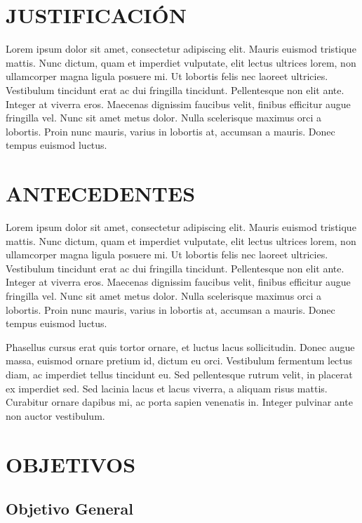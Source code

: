 \documentclass[stu, 12pt, helv, letterpaper, donotrepeattitle, floatsintext, natbib]{apa7}
\begin{document}
\section*{JUSTIFICACIÓN}

Lorem ipsum dolor sit amet, consectetur adipiscing elit. Mauris euismod tristique mattis. Nunc dictum, quam et imperdiet vulputate, elit lectus ultrices lorem, non ullamcorper magna ligula posuere mi. Ut lobortis felis nec laoreet ultricies. Vestibulum tincidunt erat ac dui fringilla tincidunt. Pellentesque non elit ante. Integer at viverra eros. Maecenas dignissim faucibus velit, finibus efficitur augue fringilla vel. Nunc sit amet metus dolor. Nulla scelerisque maximus orci a lobortis. Proin nunc mauris, varius in lobortis at, accumsan a mauris. Donec tempus euismod luctus.

\section*{ANTECEDENTES}

Lorem ipsum dolor sit amet, consectetur adipiscing elit. Mauris euismod tristique mattis. Nunc dictum, quam et imperdiet vulputate, elit lectus ultrices lorem, non ullamcorper magna ligula posuere mi. Ut lobortis felis nec laoreet ultricies. Vestibulum tincidunt erat ac dui fringilla tincidunt. Pellentesque non elit ante. Integer at viverra eros. Maecenas dignissim faucibus velit, finibus efficitur augue fringilla vel. Nunc sit amet metus dolor. Nulla scelerisque maximus orci a lobortis. Proin nunc mauris, varius in lobortis at, accumsan a mauris. Donec tempus euismod luctus.

Phasellus cursus erat quis tortor ornare, et luctus lacus sollicitudin. Donec augue massa, euismod ornare pretium id, dictum eu orci. Vestibulum fermentum lectus diam, ac imperdiet tellus tincidunt eu. Sed pellentesque rutrum velit, in placerat ex imperdiet sed. Sed lacinia lacus et lacus viverra, a aliquam risus mattis. Curabitur ornare dapibus mi, ac porta sapien venenatis in. Integer pulvinar ante non auctor vestibulum.


\section*{OBJETIVOS}

\subsection*{Objetivo General}
\end{document}
